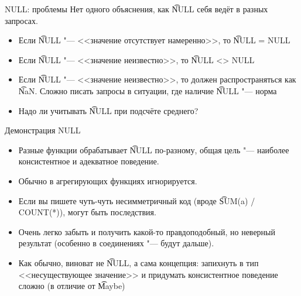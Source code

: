 \begin{frame}{NULL: проблемы}
	Нет одного объяснения, как \t{NULL} себя ведёт в разных запросах.

	\begin{itemize}
		\item
			Если \t{NULL} "--- <<значение отсутствует намеренно>>, то \t{NULL = NULL}
		\item
			Если \t{NULL} "--- <<значение неизвестно>>, то \t{NULL <> NULL}
		\item
			Если \t{NULL} "--- <<значение неизвестно>>, то должен распространяться как \t{NaN}.
			Сложно писать запросы в ситуации, где наличие \t{NULL} "--- норма
		\item
			Надо ли учитывать \t{NULL} при подсчёте среднего?
	\end{itemize}
\end{frame}

\begin{frame}{Демонстрация NULL}
    \begin{itemize}
    	\item Разные функции обрабатывает \t{NULL} по-разному, общая цель "--- наиболее консистентное и адекватное поведение.
    	\item Обычно в агрегирующих функциях игнорируется.
    	\item Если вы пишете чуть-чуть несимметричный код (вроде \t{SUM(a) / COUNT(*)}), могут быть последствия.
    	\item Очень легко забыть и получить какой-то правдоподобный, но неверный результат (особенно в соединениях "--- будут дальше).
    	\item Как обычно, виноват не \t{NULL}, а сама концепция: запихнуть в тип <<несуществующее значение>> и придумать консистентное поведение сложно
    	      (в отличие от \t{Maybe})
    \end{itemize}
\end{frame}

